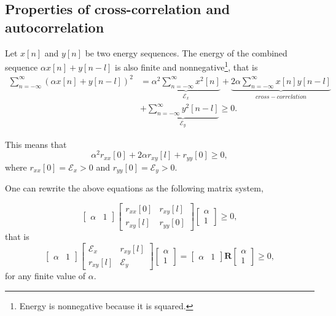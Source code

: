 \documentclass[\documentfontsize, twocolumn]{\classname}
\begin{document}
\subsection{Properties of cross-correlation and autocorrelation}
Let $x[n]$ and $y[n]$ be two energy sequences. The energy of the combined
sequence $\alpha x[n] + y[n-l]$ is also finite and nonnegative\footnote{Energy
is nonnegative because it is squared.}, that is
\begin{align*}
    \sum_{n=-\infty}^\infty (\alpha x[n] + y[n-l])^2 &= \underbrace{\alpha^2 \sum_{n=-\infty}^\infty x^2[n]}_{\mathcal E_x} + \underbrace{2\alpha \sum_{n=-\infty}^\infty x[n] y[n-l]}_{cross-correlation}\\ &+ \underbrace{\sum_{n=-\infty}^\infty y^2[n-l]}_{\mathcal E_y} \geq 0.
\end{align*}

This means that
\[
    \alpha^2 r_{xx}[0] + 2\alpha r_{xy}[l] + r_{yy}[0] \geq 0,
\]
where $r_{xx}[0] = \mathcal E_x > 0$ and $r_{yy}[0] = \mathcal E_y > 0$.

One can rewrite the above equations as the following matrix system,

\[
    \begin{bmatrix} \alpha & 1 \end{bmatrix}\begin{bmatrix} r_{xx}[0] & r_{xy}[l] \\ r_{xy}[l] & r_{yy}[0]\end{bmatrix}\begin{bmatrix}\alpha \\ 1\end{bmatrix} \geq 0,
\]
that is
\[
    \begin{bmatrix} \alpha & 1 \end{bmatrix}\begin{bmatrix} \mathcal E_x & r_{xy}[l] \\ r_{xy}[l] & \mathcal E_y \end{bmatrix}\begin{bmatrix}\alpha \\ 1\end{bmatrix} = \begin{bmatrix} \alpha & 1 \end{bmatrix}\bm{R}\begin{bmatrix} \alpha \\ 1 \end{bmatrix} \geq 0,
\]
for any finite value of $\alpha$.
\end{document}
